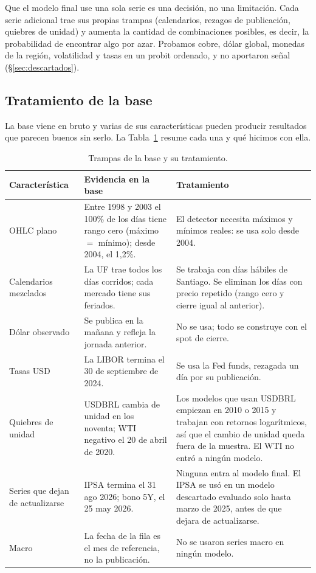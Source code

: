 \documentclass[10pt,a4paper]{article}
\begin{document}
Que el modelo final use una sola serie es una decisión, no una limitación. Cada
serie adicional trae sus propias trampas (calendarios, rezagos de publicación,
quiebres de unidad) y aumenta la cantidad de combinaciones posibles, es decir, la
probabilidad de encontrar algo por azar. Probamos cobre, dólar global, monedas de
la región, volatilidad y tasas en un probit ordenado, y no aportaron señal
(§\ref{sec:descartados}).

\subsection{Tratamiento de la base}

La base viene en bruto y varias de sus características pueden producir resultados
que parecen buenos sin serlo. La Tabla~\ref{tab:trampas} resume cada una y qué
hicimos con ella.

\begin{table}[htbp]\centering\small
\begin{tabularx}{\textwidth}{@{}lXX@{}}
\toprule
Característica & Evidencia en la base & Tratamiento \\
\midrule
OHLC plano & Entre 1998 y 2003 el 100\% de los días tiene rango cero
  (máximo $=$ mínimo); desde 2004, el 1,2\%. & El detector necesita máximos
  y mínimos reales: se usa solo desde 2004. \\
Calendarios mezclados & La UF trae todos los días corridos; cada mercado tiene
  sus feriados. & Se trabaja con días hábiles de Santiago. Se eliminan los días
  con precio repetido (rango cero y cierre igual al anterior). \\
Dólar observado & Se publica en la mañana y refleja la jornada anterior. & No se
  usa; todo se construye con el spot de cierre. \\
Tasas USD & La LIBOR termina el 30 de septiembre de 2024. & Se usa la Fed funds,
  rezagada un día por su publicación. \\
Quiebres de unidad & USDBRL cambia de unidad en los noventa; WTI negativo el 20
  de abril de 2020. & Los modelos que usan USDBRL empiezan en 2010 o 2015 y
  trabajan con retornos logarítmicos, así que el cambio de unidad queda fuera de
  la muestra. El WTI no entró a ningún modelo. \\
Series que dejan de actualizarse & IPSA termina el 31 ago 2026; bono 5Y, el 25
  may 2026. & Ninguna entra al modelo final. El IPSA se usó en un modelo
  descartado evaluado solo hasta marzo de 2025, antes de que dejara de
  actualizarse. \\
Macro & La fecha de la fila es el mes de referencia, no la publicación. & No se
  usaron series macro en ningún modelo. \\
\bottomrule
\end{tabularx}
\caption{Trampas de la base y su tratamiento.}\label{tab:trampas}
\end{table}
\end{document}
